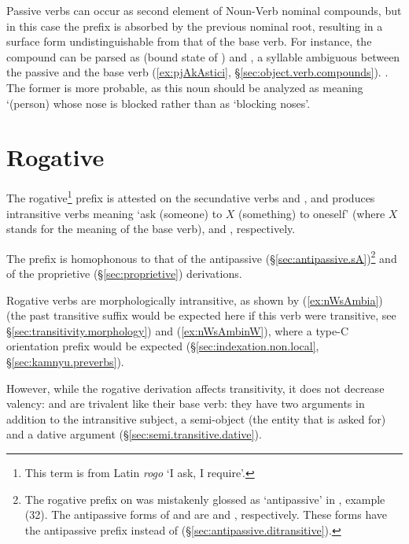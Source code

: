 Passive verbs can occur as second element of Noun-Verb nominal compounds, but in this case the  prefix is absorbed by the previous nominal root, resulting in a surface form undistinguishable from that of the base verb. For instance, the compound  can be parsed as  (bound state of  ) and , a syllable ambiguous between the passive  and the base verb   (\ref{ex:pjAkAstici}, §\ref{sec:object.verb.compounds}). . The former is more probable, as this noun should be analyzed as meaning `(person) whose nose is blocked rather than as `blocking noses'.
 
\section{Rogative} \label{sec:rogative.derivation}
 
The rogative\footnote{This term is from Latin \textit{rogo} `I ask, I require'. }  prefix is attested on the secundative verbs  and , and produces intransitive verbs meaning `ask (someone) to $X$ (something) to oneself’ (where $X$ stands for the meaning of the base verb),  and  , respectively.

The  prefix is homophonous to that of the antipassive (§\ref{sec:antipassive.sA})\footnote{The rogative prefix on  was mistakenly glossed as `antipassive’ in \citet[215]{jacques12demotion}, example (32). The  antipassive forms of  and   are  and , respectively. These forms have the  antipassive prefix instead of  (§\ref{sec:antipassive.ditransitive}). } and of the proprietive (§\ref{sec:proprietive}) derivations.

Rogative verbs are morphologically intransitive, as shown by (\ref{ex:nWsAmbia}) (the past transitive suffix  would be expected here if this verb were transitive, see §\ref{sec:transitivity.morphology}) and (\ref{ex:nWsAmbinW}), where a type-C orientation prefix would be expected (§\ref{sec:indexation.non.local}, §\ref{sec:kamnyu.preverbs}). 

However, while the rogative derivation affects transitivity, it does not decrease valency:  and   are trivalent like their base verb: they have two arguments in addition to the intransitive subject, a semi-object (the entity that is asked for) and a dative argument (§\ref{sec:semi.transitive.dative}).


